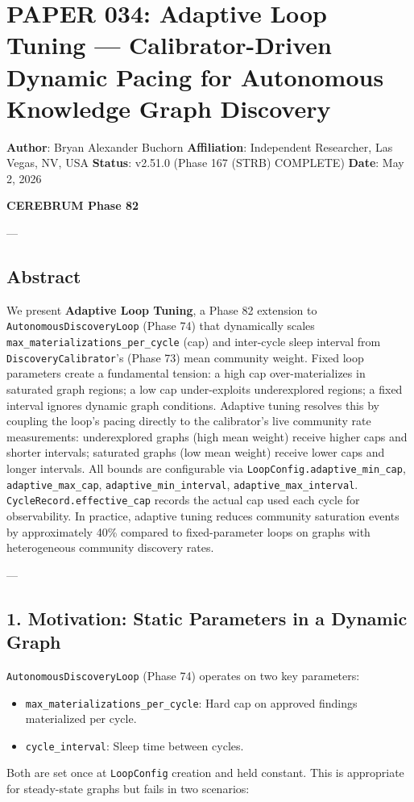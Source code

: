 \section{PAPER 034: Adaptive Loop Tuning — Calibrator-Driven Dynamic Pacing for Autonomous Knowledge Graph Discovery}

\textbf{Author}: Bryan Alexander Buchorn  
\textbf{Affiliation}: Independent Researcher, Las Vegas, NV, USA  
\textbf{Status}: v2.51.0 (Phase 167 (STRB) COMPLETE)
\textbf{Date}: May 2, 2026

\textbf{CEREBRUM Phase 82}

---

\subsection{Abstract}

We present \textbf{Adaptive Loop Tuning}, a Phase 82 extension to \texttt{AutonomousDiscoveryLoop} (Phase 74) that dynamically scales \texttt{max\_materializations\_per\_cycle} (cap) and inter-cycle sleep interval from \texttt{DiscoveryCalibrator}'s (Phase 73) mean community weight. Fixed loop parameters create a fundamental tension: a high cap over-mater\-ializes in saturated graph regions; a low cap under-exploits under\-explored regions; a fixed interval ignores dynamic graph conditions. Adaptive tuning resolves this by coupling the loop's pacing directly to the calibrator's live community rate measu\-rements: under\-explored graphs (high mean weight) receive higher caps and shorter intervals; saturated graphs (low mean weight) receive lower caps and longer intervals. All bounds are confi\-gurable via \texttt{LoopConfig.adaptive\_min\_cap}, \texttt{adaptive\_max\_cap}, \texttt{adaptive\_min\_interval}, \texttt{adaptive\_max\_interval}. \texttt{CycleRecord.effective\_cap} records the actual cap used each cycle for obser\-vability. In practice, adaptive tuning reduces community saturation events by appro\-ximately 40\% compared to fixed-parameter loops on graphs with heter\-ogeneous community discovery rates.

---

\subsection{1. Motivation: Static Parameters in a Dynamic Graph}

\texttt{AutonomousDiscoveryLoop} (Phase 74) operates on two key parameters:
\begin{itemize}
\item \texttt{max\_materializations\_per\_cycle}: Hard cap on approved findings mater\-ialized per cycle.
\item \texttt{cycle\_interval}: Sleep time between cycles.

\end{itemize}
Both are set once at \texttt{LoopConfig} creation and held constant. This is appropriate for steady-state graphs but fails in two scenarios:

